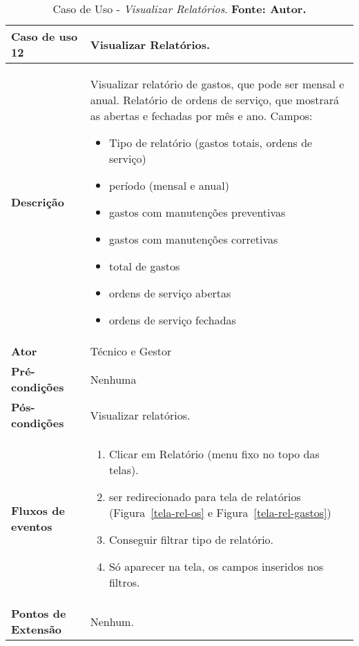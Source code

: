 \begin{apendicesenv}
\begin{table}[H]
\centering
\caption{Caso de Uso - \textit{Visualizar Relatórios}. \textbf{Fonte: Autor.}}
\label{uc12}
\begin{tabular}{ | p{5cm} | p{10cm} |  }
\hline
	\textbf{Caso de uso 12} & Visualizar Relatórios. \\ \hline
	\textbf{Descrição} & Visualizar relatório de gastos, que pode ser mensal e anual. Relatório de ordens de serviço, que mostrará as abertas e fechadas por mês e ano. Campos: \begin{itemize}
															                    \item Tipo de relatório (gastos totais, ordens de serviço)
															                    \item período (mensal e anual)
															                    \item gastos com manutenções preventivas
															                    \item gastos com manutenções corretivas
															                    \item total de gastos
															                    \item ordens de serviço abertas 
															                    \item ordens de serviço fechadas
															                    \end{itemize} \\ \hline
	\textbf{Ator} & Técnico e Gestor \\ \hline
	\textbf{Pré-condições} & Nenhuma \\ \hline
	\textbf{Pós-condições} & Visualizar relatórios. \\ \hline
	\textbf{Fluxos de eventos} & \begin{enumerate}
									\item Clicar em Relatório (menu fixo no topo das telas).
									\item ser redirecionado para  tela de relatórios (Figura~\ref{tela-rel-os} e Figura~\ref{tela-rel-gastos}) 
									\item Conseguir filtrar tipo de relatório.
									\item Só aparecer na tela, os campos inseridos nos filtros.
								 \end{enumerate}   \\ \hline
	\textbf{Pontos de Extensão} & Nenhum. \\ \hline
\end{tabular}
\end{table}


\end{apendicesenv}
